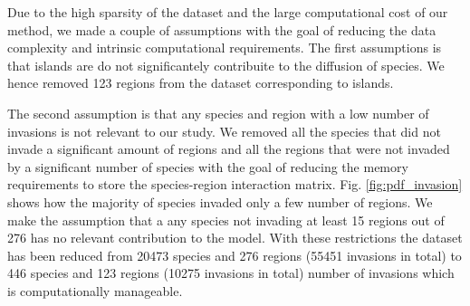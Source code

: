 \documentclass[mscthesis]{usiinfthesis}
\begin{document}
Due to the high sparsity of the dataset and the large computational cost of our method, we made a couple of assumptions with the goal of reducing the data complexity and intrinsic computational requirements. The first assumptions is that islands are do not significantely contribuite to the diffusion of species. We hence removed 123 regions from the dataset corresponding to islands. 

The second assumption is that any species and region with a low number of invasions is not relevant to our study. We removed all the species that did not invade a significant amount of regions and all the regions that were not invaded by a significant number of species with the goal of reducing the memory requirements to store the species-region interaction matrix. Fig. \ref{fig:pdf_invasion} shows how the majority of species invaded only a few number of regions. We make the assumption that a any species not invading at least 15 regions out of 276 has no relevant contribution to the model. With these restrictions the dataset has been reduced from 20473 species and 276 regions (55451 invasions in total) to 446 species and 123 regions (10275 invasions in total) number of invasions which is computationally manageable. 



\end{document}
